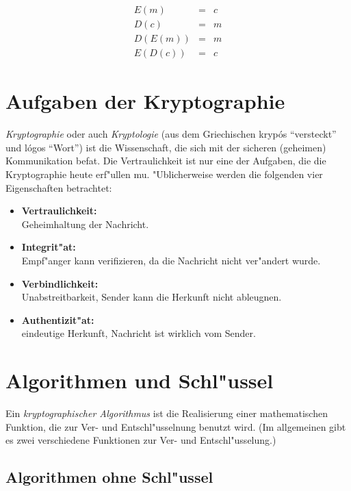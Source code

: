 \begin{eqnarray*}
  E(m) & = & c \\
  D(c) & = & m \\
  D(E(m)) & = & m \\
  E(D(c)) & = & c 
\end{eqnarray*}


\section*{Aufgaben der Kryptographie}

{\em Kryptographie} oder auch {\em Kryptologie} (aus dem Griechischen
kryp\'os "`versteckt"' und l\'ogos "`Wort"') ist die Wissenschaft, die
sich mit der sicheren (geheimen) Kommunikation befa\3t. Die
Vertraulichkeit ist nur eine der Aufgaben, die die Kryptographie heute
erf"ullen mu\3. "Ublicherweise werden die folgenden vier Eigenschaften
betrachtet:
\begin{itemize}
  \item{\bf Vertraulichkeit:} \\Geheimhaltung der Nachricht.
  \item{\bf Integrit"at:}  \\ Empf"anger kann verifizieren, da\3 die Nachricht nicht ver"andert wurde.
  \item{\bf Verbindlichkeit:} \\ Unabstreitbarkeit, Sender kann die Herkunft nicht ableugnen.
  \item{\bf Authentizit"at:} \\ eindeutige Herkunft, Nachricht ist wirklich vom Sender.
\end{itemize}


\section*{Algorithmen und Schl"ussel}

Ein {\em kryptographischer Algorithmus} ist die Realisierung einer
mathematischen Funktion, die zur Ver- und Entschl"usselnung benutzt
wird. (Im allgemeinen gibt es zwei verschiedene Funktionen zur Ver-
und Entschl"usselung.)


\subsection*{Algorithmen ohne Schl"ussel}

